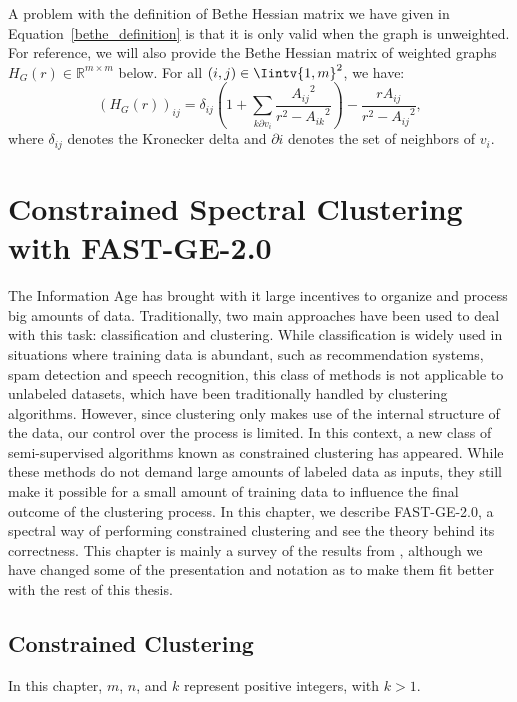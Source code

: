 A problem with the definition of Bethe Hessian matrix we have given in Equation~\vref{bethe_definition} is that it is only valid when the graph is unweighted.
For reference, we will also provide the Bethe Hessian matrix of weighted graphs $H_G(r) \in \mathbb R^{m \times m}$ below. For all $(i,j) \in \Iintv{1,m}^2$, we have:
\begin{equation}
   \left( H_G(r) \right)_{ij} = \delta _{ij} \left( 1 + \sum _{k \partial v_i}\frac{{A_{ij}}^2}{r^2 - {A_{ik}}^2} \right) - \frac{r A_{ij}}{r^2 - {A_{ij}}^2},
\end{equation}
where $\delta_{ij}$ denotes the Kronecker delta and $\partial i$ denotes the set of neighbors of $v_i$.



\chapter{Constrained Spectral Clustering with FAST-GE-2.0}

The Information Age has brought with it large incentives to organize and process big amounts of data.
Traditionally, two main approaches have been used to deal with this task: classification and clustering.
While classification is widely used in situations where training data is abundant, such as recommendation systems, spam detection and speech recognition, this class of methods is not applicable to unlabeled datasets, which have been traditionally handled by clustering algorithms.
However, since clustering only makes use of the internal structure of the data, our control over the process is limited.
In this context, a new class of semi-supervised algorithms known as constrained clustering has appeared.
While these methods do not demand large amounts of labeled data as inputs, they still make it possible for a small amount of training data to influence the final outcome of the clustering process.
In this chapter, we describe FAST-GE-2.0, a spectral way of performing constrained clustering and see the theory behind its correctness.
This chapter is mainly a survey of the results from \cite{fastge2}, although we have changed some of the presentation and notation as to make them fit better with the rest of this thesis.

\section{Constrained Clustering}
In this chapter, $m$, $n$, and $k$ represent positive integers, with $k > 1$.

